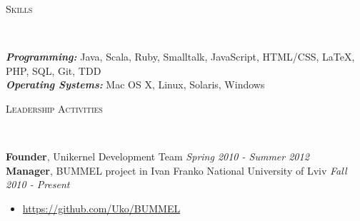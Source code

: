 \documentclass[9pt]{article}
\newenvironment{changemargin}[2]{%
  \begin{list}{}{%
    \setlength{\topsep}{0pt}%
    \setlength{\leftmargin}{#1}%
    \setlength{\rightmargin}{#2}%
    \setlength{\listparindent}{\parindent}%
    \setlength{\itemindent}{\parindent}%
    \setlength{\parsep}{\parskip}%
  }%
  \item[]}{\end{list}
}
\newcommand{\lineover}{
	\begin{changemargin}{-0.05in}{-0.05in}
		\vspace*{-8pt}
		\hrulefill \\
		\vspace*{-2pt}
	\end{changemargin}
}
\newcommand{\header}[1]{
	\begin{changemargin}{-0.5in}{-0.5in}
		\scshape{#1}\\
  	\lineover
	\end{changemargin}
}
\newenvironment{body} {
	\vspace*{-16pt}
	\begin{changemargin}{-0.25in}{-0.5in}
  }	
	{\end{changemargin}
}
\begin{document}
\smallskip


\header{Skills}

\begin{body}
	\vspace{14pt}
	\emph{\textbf{Programming:}}{} Java, Scala, Ruby, Smalltalk, JavaScript, HTML/CSS, \LaTeX, PHP, SQL, Git, TDD\\
	\medskip
	\emph{\textbf{Operating Systems:}}{} Mac OS X, Linux, Solaris, Windows\\
\end{body}

\smallskip


\header{Leadership Activities}

\begin{body}
	\vspace{14pt}
	\textbf{Founder}, Unikernel Development Team \hfill {} \emph{Spring 2010 - Summer 2012}\\
	\smallskip
	\textbf{Manager}, BUMMEL project in Ivan Franko National University of Lviv \hfill{} \emph{Fall 2010 - Present}\\
	\vspace*{-4pt}
	\begin{itemize} \itemsep -0pt
		\item \url{https://github.com/Uko/BUMMEL}
	\end{itemize}
\end{body}
\end{document}
